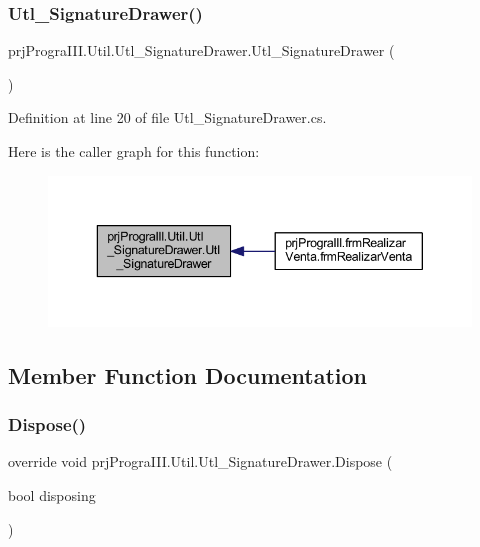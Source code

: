\subsubsection{\texorpdfstring{Utl\+\_\+\+Signature\+Drawer()}{Utl\_SignatureDrawer()}}
{\footnotesize\ttfamily prj\+Progra\+I\+I\+I.\+Util.\+Utl\+\_\+\+Signature\+Drawer.\+Utl\+\_\+\+Signature\+Drawer (\begin{DoxyParamCaption}{ }\end{DoxyParamCaption})}



Definition at line 20 of file Utl\+\_\+\+Signature\+Drawer.\+cs.

Here is the caller graph for this function\+:
\nopagebreak
\begin{figure}[H]
\begin{center}
\leavevmode
\includegraphics[width=343pt]{classprj_progra_i_i_i_1_1_util_1_1_utl___signature_drawer_a6cb8f4b8ebff26bc7ce3cdf2a5ff489b_icgraph}
\end{center}
\end{figure}


\subsection{Member Function Documentation}
\hypertarget{classprj_progra_i_i_i_1_1_util_1_1_utl___signature_drawer_ab856654631111ac4fb38eb6053a48a4f}{}\label{classprj_progra_i_i_i_1_1_util_1_1_utl___signature_drawer_ab856654631111ac4fb38eb6053a48a4f} 
\subsubsection{\texorpdfstring{Dispose()}{Dispose()}}
{\footnotesize\ttfamily override void prj\+Progra\+I\+I\+I.\+Util.\+Utl\+\_\+\+Signature\+Drawer.\+Dispose (\begin{DoxyParamCaption}\item[{bool}]{disposing }\end{DoxyParamCaption})\hspace{0.3cm}{\ttfamily [protected]}}



